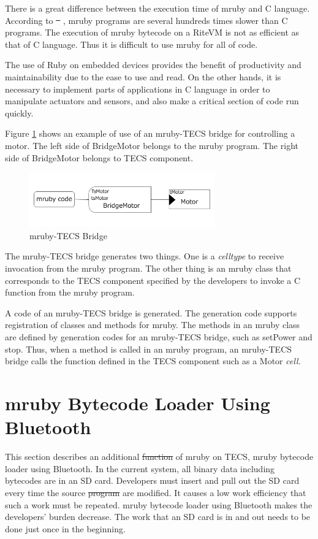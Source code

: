 \documentclass[conference,compsoc]{IEEEtran}
\providecommand{\DIFadd}[1]{{\protect\color{blue}\uwave{#1}}} %
\providecommand{\DIFdel}[1]{{\protect\color{red}\sout{#1}}}                      %
\providecommand{\DIFaddbegin}{} %
\providecommand{\DIFaddend}{} %
\providecommand{\DIFdelbegin}{} %
\providecommand{\DIFdelend}{} %
\begin{document}
There is a great difference between the execution time of mruby and C language.
According to  \DIFdelbegin \DIFdel{\mbox{%
\cite{7153813}}%
}\DIFdelend \DIFaddbegin \DIFadd{\mbox{%
\cite{par:mrubyonTECS}}%
}\DIFaddend , mruby programs are several hundreds times slower than C programs.
The execution of mruby bytecode on a RiteVM is not as efficient as that of C language.
Thus it is difficult to use mruby for all of code.

The use of Ruby on embedded devices provides the benefit of productivity and maintainability due to the ease to use and read.
On the other hands, it is necessary to implement parts of applications in C language in order to manipulate actuators and sensors, and also make a critical section of code run quickly.

Figure \ref{fig:mruby_TECS_bridge} shows an example of use of an mruby-TECS bridge for controlling a motor.
The left side of BridgeMotor belongs to the mruby program.
The right side of BridgeMotor belongs to TECS component.
\begin{figure}[t]
    \centering
    \includegraphics[width=8cm,clip]{figure/mruby_TECS_bridge.pdf}
    \caption{mruby-TECS Bridge}
    \label{fig:mruby_TECS_bridge}
\end{figure}

The mruby-TECS bridge generates two things.
One is a {\it celltype} to receive invocation from the mruby program.
The other thing is an mruby class that corresponds to the TECS component specified by the developers to invoke a C function from the mruby program.

A code of an mruby-TECS bridge is generated.
The generation code supports registration of classes and methods for mruby.
The methods in an mruby class are defined by generation codes for an mruby-TECS bridge, such as setPower and stop.
Thus, when a method is called in an mruby program, an mruby-TECS bridge calls the function defined in the TECS component such as a Motor {\it cell}.


\section{mruby Bytecode Loader Using Bluetooth}
\label{sec:mruby bytecode loader using Bluetooth}
This section describes an additional \DIFdelbegin \DIFdel{function }\DIFdelend \DIFaddbegin \DIFadd{feature }\DIFaddend of mruby on TECS, mruby bytecode loader using Bluetooth.
In the current system, all binary data including bytecodes are in an SD card.
Developers must insert and pull out the SD card every time the source \DIFdelbegin \DIFdel{program }\DIFdelend \DIFaddbegin \DIFadd{programs }\DIFaddend are modified.
It causes a low work efficiency that such a work must be repeated.
mruby bytecode loader using Bluetooth makes the developers' burden decrease.
The work that an SD card is in and out needs to be done just once in the beginning.
\end{document}
